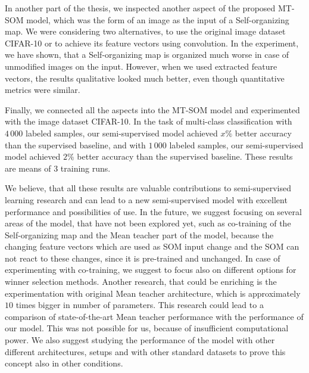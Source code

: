 In another part of the thesis, we inspected another aspect of the proposed MT-SOM model, which was the form of an image as the input of a Self-organizing map. We were considering two alternatives, to use the original image dataset CIFAR-10 or to achieve its feature vectors using convolution. In the experiment, we have shown, that a Self-organizing map is organized much worse in case of unmodified images on the input. However, when we used extracted feature vectors, the results qualitative looked much better, even though quantitative metrics were similar.

Finally, we connected all the aspects into the MT-SOM model and experimented with the image dataset CIFAR-10. In the task of multi-class classification with $4\,000$ labeled samples, our semi-supervised model achieved $x\%$ better accuracy than the supervised baseline, and with $1\,000$ labeled samples, our semi-supervised model achieved $2\%$ better accuracy than the supervised baseline. These results are means of $3$ training runs. 

We believe, that all these results are valuable contributions to semi-supervised learning research and can lead to a new semi-supervised model with excellent performance and possibilities of use. In the future, we suggest focusing on several areas of the model, that have not been explored yet, such as co-training of the Self-organizing map and the Mean teacher part of the model, because the changing feature vectors which are used as SOM input change and the SOM can not react to these changes, since it is pre-trained and unchanged. In case of experimenting with co-training, we suggest to focus also on different options for winner selection methods. Another research, that could be enriching is the experimentation with original Mean teacher architecture, which is approximately $10$ times bigger in number of parameters. This research could lead to a comparison of state-of-the-art Mean teacher performance with the performance of our model. This was not possible for us, because of insufficient computational power. We also suggest studying the performance of the model with other different architectures, setups and with other standard datasets to prove this concept also in other conditions.